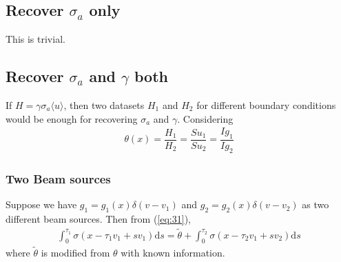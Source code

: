 \documentclass[12pt,a4paper]{article}
\newcommand{\avg}[1]{\langle#1\rangle}
\begin{document}
\subsection{Recover $\sigma_a$ only}
This is trivial.
\subsection{Recover $\sigma_a$ and $\gamma$ both}
If $H = \gamma\sigma_a \avg{u}$, then two datasets $H_1$ and $H_2$ for different boundary conditions would be enough for recovering $\sigma_a$ and $\gamma$. Considering 
\begin{eqnarray}\label{eq:31}
\theta(x) = \dfrac{H_1}{H_2} = \dfrac{Su_1}{Su_2} =\dfrac{Ig_1}{Ig_2}
\end{eqnarray}
\subsubsection{Two Beam sources}
Suppose we have $g_1 = g_1(x)\delta(v - v_1)$ and $g_2 = g_2(x)\delta(v- v_2)$ as two different beam sources. Then from (\ref{eq:31}), 
\begin{eqnarray}
\int_0^{\tau_1}\sigma(x - \tau_1 v_1 + sv_1)\mathrm{d}s= \tilde{\theta}+\int_0^{\tau_2}\sigma(x - \tau_2 v_1 + sv_2)\mathrm{d}s
\end{eqnarray}
where $\tilde{\theta}$ is modified from $\theta$ with known information.
\end{document}
